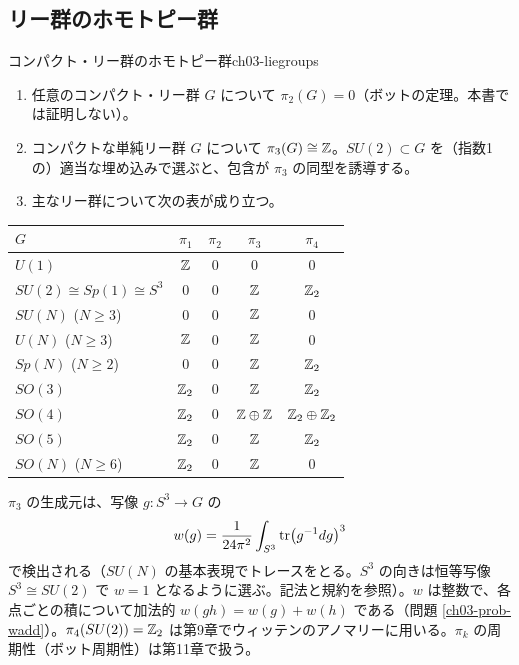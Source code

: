 \subsection{リー群のホモトピー群}
\begin{myprop}{コンパクト・リー群のホモトピー群}{ch03-liegroups}
\begin{enumerate}
\item 任意のコンパクト・リー群 $G$ について $\pi_2(G)=0$（ボットの定理。本書では証明しない）。
\item コンパクトな単純リー群 $G$ について $\pi_3(G)\cong\mathbb{Z}$。$SU(2)\subset G$ を（指数1の）適当な埋め込みで選ぶと、包含が $\pi_3$ の同型を誘導する。
\item 主なリー群について次の表が成り立つ。
\end{enumerate}
\begin{center}
\renewcommand{\arraystretch}{1.15}
\begin{tabular}{l|cccc}
$G$ & $\pi_1$ & $\pi_2$ & $\pi_3$ & $\pi_4$\\ \hline
$U(1)$ & $\mathbb{Z}$ & $0$ & $0$ & $0$\\
$SU(2)\cong Sp(1)\cong S^3$ & $0$ & $0$ & $\mathbb{Z}$ & $\mathbb{Z}_2$\\
$SU(N)$ ($N\ge3$) & $0$ & $0$ & $\mathbb{Z}$ & $0$\\
$U(N)$ ($N\ge3$) & $\mathbb{Z}$ & $0$ & $\mathbb{Z}$ & $0$\\
$Sp(N)$ ($N\ge2$) & $0$ & $0$ & $\mathbb{Z}$ & $\mathbb{Z}_2$\\
$SO(3)$ & $\mathbb{Z}_2$ & $0$ & $\mathbb{Z}$ & $\mathbb{Z}_2$\\
$SO(4)$ & $\mathbb{Z}_2$ & $0$ & $\mathbb{Z}\oplus\mathbb{Z}$ & $\mathbb{Z}_2\oplus\mathbb{Z}_2$\\
$SO(5)$ & $\mathbb{Z}_2$ & $0$ & $\mathbb{Z}$ & $\mathbb{Z}_2$\\
$SO(N)$ ($N\ge6$) & $\mathbb{Z}_2$ & $0$ & $\mathbb{Z}$ & $0$
\end{tabular}
\end{center}
\end{myprop}
$\pi_3$ の生成元は、写像 $g\colon S^3\to G$ の
\begin{equation}
w(g)=\frac{1}{24\pi^2}\int_{S^3}\tr\bigl(g^{-1}dg\bigr)^3\label{eq:ch03-w}
\end{equation}
で検出される（$SU(N)$ の基本表現でトレースをとる。$S^3$ の向きは恒等写像 $S^3\cong SU(2)$ で $w=1$ となるように選ぶ。記法と規約を参照）。$w$ は整数で、各点ごとの積について加法的 $w(gh)=w(g)+w(h)$ である（問題 \ref{ch03-prob-wadd}）。$\pi_4(SU(2))=\mathbb{Z}_2$ は第9章でウィッテンのアノマリーに用いる。$\pi_k$ の周期性（ボット周期性）は第11章で扱う。

